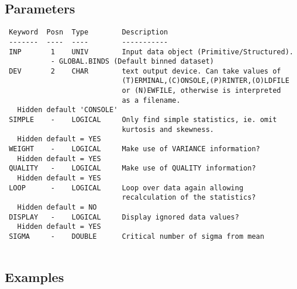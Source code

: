 \documentclass{book}
\renewcommand{\_}{{\tt\char'137}}     %
\begin{document}
\subsection{Parameters}
\begin{verbatim}
 Keyword  Posn  Type        Description
 -------  ----  ----        -----------
 INP       1    UNIV        Input data object (Primitive/Structured).
           - GLOBAL.BINDS (Default binned dataset)
 DEV       2    CHAR        text output device. Can take values of
                            (T)ERMINAL,(C)ONSOLE,(P)RINTER,(O)LDFILE
                            or (N)EWFILE, otherwise is interpreted
                            as a filename.
   Hidden default 'CONSOLE'
 SIMPLE    -    LOGICAL     Only find simple statistics, ie. omit
                            kurtosis and skewness.
   Hidden default = YES
 WEIGHT    -    LOGICAL     Make use of VARIANCE information?
   Hidden default = YES
 QUALITY   -    LOGICAL     Make use of QUALITY information?
   Hidden default = YES
 LOOP      -    LOGICAL     Loop over data again allowing
                            recalculation of the statistics?
   Hidden default = NO
 DISPLAY   -    LOGICAL     Display ignored data values?
   Hidden default = YES
 SIGMA     -    DOUBLE      Critical number of sigma from mean
 
\end{verbatim}\subsection{Examples}
\end{document}

